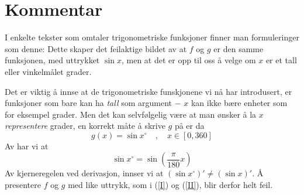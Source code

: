 



\section*{Kommentar}
I enkelte tekster som omtaler trigonometriske funksjoner finner man formuleringer som denne:
Dette skaper det feilaktige bildet av at $ f $ og $ g $ er den samme funksjonen, med uttrykket $ \sin x $, men at det er opp til oss å velge om $ x $ er et tall eller vinkelmålet grader.\vsk

Det er viktig å innse at de trigonometriske funskjonene vi nå har introdusert, er funksjoner som bare kan ha \textit{tall} som argument $ - $ $ x $ kan ikke bære enheter som for eksempel grader. Men det kan selvfølgelig være at man ønsker å la $ x $ \textsl{representere} grader, en korrekt måte å skrive $ g $ på er da
\[ g(x)=\sin x^\circ\quad,\quad x\in[0, 360]\]
Av \dref{} har vi at
\[ \sin x^\circ =\sin\left(\frac{\pi}{180}x\right) \]
Av kjerneregelen ved derivasjon, innser vi at $ (\sin x^\circ)'\neq(\sin x)'$. Å presentere $ f $ og $ g $ med like uttrykk, som i (\ref{I})  og (\ref{II}), blir derfor helt feil.\vsk

